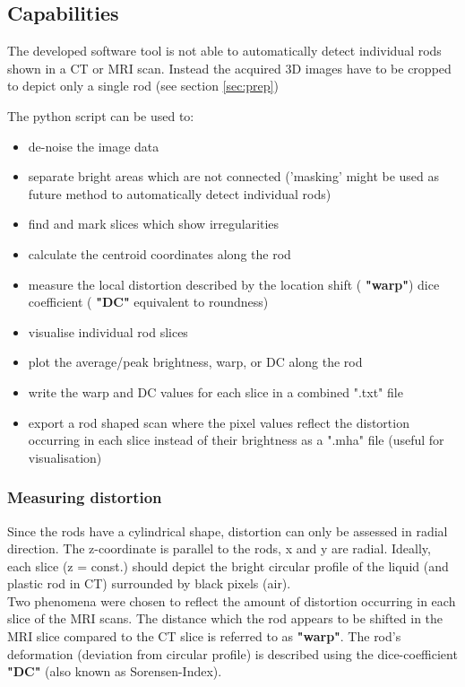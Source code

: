 \subsection{Capabilities}

The developed software tool is not able to automatically detect individual rods shown in a CT or MRI scan.
Instead the acquired 3D images have to be cropped to depict only a single rod (see section \ref{sec:prep})

The python script can be used to:
\begin{itemize}
 \item de-noise the image data
 \item separate bright areas which are not connected ('masking' might be used as future method to automatically detect individual rods)
 \item find and mark slices which show irregularities
 \item calculate the centroid coordinates along the rod
 \item measure the local distortion described by the
  \subitem location shift ( \textbf{"warp"})
  \subitem dice coefficient ( \textbf{"DC"} equivalent to roundness)
 \item visualise individual rod slices
 \item plot the average/peak brightness, warp, or DC along the rod
 \item write the warp and DC values for each slice in a combined ".txt" file
 \item export a rod shaped scan where the pixel values reflect the distortion occurring in each slice instead of their brightness as a ".mha" file (useful for visualisation)
\end{itemize}

\subsubsection{Measuring distortion}

Since the rods have a cylindrical shape, distortion can only be assessed in radial direction.
The z-coordinate is parallel to the rods, x and y are radial.
Ideally, each slice (z = const.) should depict the bright circular profile of the liquid (and plastic rod in CT) surrounded by black pixels (air).
\\
Two phenomena were chosen to reflect the amount of distortion occurring in each slice of the MRI scans.
The distance which the rod appears to be shifted in the MRI slice compared to the CT slice is referred to as \textbf{"warp"}.
The rod's deformation (deviation from circular profile) is described using the dice-coefficient \textbf{"DC"} (also known as Sorensen-Index).

